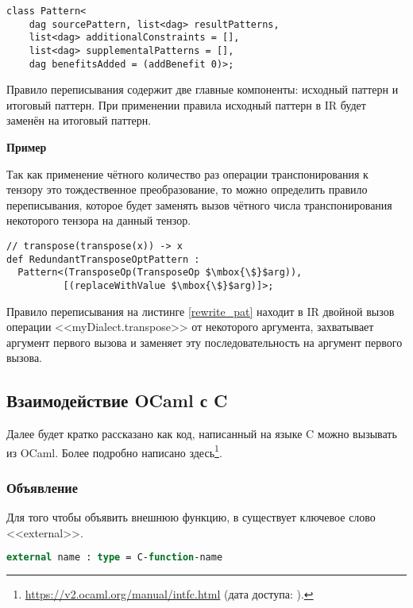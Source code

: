 \begin{lstlisting}[caption={Базовый класс для шаблона.}, frame=single]
class Pattern<
    dag sourcePattern, list<dag> resultPatterns,
    list<dag> additionalConstraints = [],
    list<dag> supplementalPatterns = [],
    dag benefitsAdded = (addBenefit 0)>;
\end{lstlisting}

Правило переписывания содержит две главные компоненты: исходный паттерн и итоговый паттерн. При применении правила исходный паттерн в IR будет заменён на итоговый паттерн.

\textbf{Пример}

Так как применение чётного количество раз операции транспонирования к тензору это тождественное преобразование, то можно определить правило переписывания, которое будет заменять вызов чётного числа транспонирования некоторого тензора на данный тензор.

\begin{lstlisting}[caption={Пример создания правила переписывания для операции, определённой на листинге \ref{op_tblgen}}, label={rewrite_pat}, frame=single]
// transpose(transpose(x)) -> x
def RedundantTransposeOptPattern :
  Pattern<(TransposeOp(TransposeOp $\mbox{\$}$arg)),
          [(replaceWithValue $\mbox{\$}$arg)]>;
\end{lstlisting}

Правило переписывания на листинге \ref{rewrite_pat} находит в IR двойной вызов операции <<myDialect.transpose>> от некоторого аргумента, захватывает аргумент первого вызова и заменяет эту последовательность на аргумент первого вызова.

\subsection{Взаимодействие OCaml с C}

Далее будет кратко рассказано как код, написанный на языке C можно вызывать из OCaml. Более подробно написано здесь\footnote{\url{https://v2.ocaml.org/manual/intfc.html} (дата доступа:   ).}.

\subsubsection{Объявление}

Для того чтобы объявить внешнюю функцию, в \OCaml{} существует ключевое слово <<external>>.
\begin{lstlisting}[caption={Синтаксис объявления внешней функции.},language=Caml, frame=single]
external name : type = C-function-name
\end{lstlisting}


